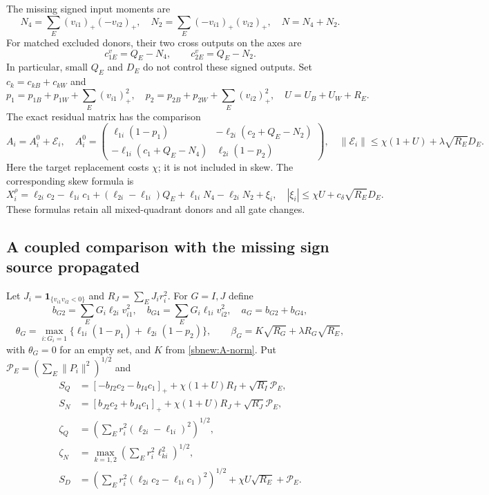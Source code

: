 \documentclass{article} %
\theoremstyle{plain}
\theoremstyle{definition}
\theoremstyle{remark}
\begin{document}
The missing signed input moments are
\begin{equation}\label{sbcouple:N}
 N_4=\sum_E(v_{i1})_+(-v_{i2})_+,\quad
 N_2=\sum_E(-v_{i1})_+(v_{i2})_+,\quad N=N_4+N_2.
\end{equation}
For matched excluded donors, their two cross outputs on the axes are
\[
 c_{1E}^v=Q_E-N_4,\qquad c_{2E}^v=Q_E-N_2.
\]
In particular, small $Q_E$ and $D_E$ do not control these signed outputs.
Set $c_k=c_{kB}+c_{kW}$ and
\[
 p_1=p_{1B}+p_{1W}+\sum_E(v_{i1})_+^2,\quad
 p_2=p_{2B}+p_{2W}+\sum_E(v_{i2})_+^2,\quad
 U=U_B+U_W+R_E.
\]
The exact residual matrix has the comparison
\begin{equation}\label{sbcouple:A0}
 A_i=A_i^0+\mathcal E_i,\quad
 A_i^0=\begin{pmatrix}
 \ell_{1i}(1-p_1)&-\ell_{2i}(c_2+Q_E-N_2)\\
 -\ell_{1i}(c_1+Q_E-N_4)&\ell_{2i}(1-p_2)
 \end{pmatrix},\quad
 \|\mathcal E_i\|\le\chi(1+U)+\lambda\sqrt{R_E}D_E.
\end{equation}
Here the target replacement costs $\chi$; it is not included in skew.
The corresponding skew formula is
\begin{equation}\label{sbcouple:X0}
 X_i^\rho=\ell_{2i}c_2-\ell_{1i}c_1
       +(\ell_{2i}-\ell_{1i})Q_E+\ell_{1i}N_4-\ell_{2i}N_2+\xi_i,
 \quad |\xi_i|\le\chi U+c_\delta\sqrt{R_E}D_E.
\end{equation}
These formulas retain all mixed-quadrant donors and all gate changes.

\subsection{A coupled comparison with the missing sign source propagated}

Let $J_i=\mathbf1_{\{v_{i1}v_{i2}<0\}}$ and $R_J=\sum_EJ_i r_i^2$.
For $G=I,J$ define
\[
 b_{G2}=\sum_EG_i\ell_{2i}v_{i1}^2,\quad
 b_{G4}=\sum_EG_i\ell_{1i}v_{i2}^2,\quad a_G=b_{G2}+b_{G4},
\]
\[
 \theta_G=\max_{i:G_i=1}
       \{\ell_{1i}(1-p_1)+\ell_{2i}(1-p_2)\},\qquad
 \beta_G=K\sqrt{R_G}+\lambda R_G\sqrt{R_E},
\]
with $\theta_G=0$ for an empty set, and $K$ from \eqref{sbnew:A-norm}.
Put $\mathcal P_E=(\sum_E\|P_i\|^2)^{1/2}$ and
\begin{align*}
 S_Q&=[-b_{I2}c_2-b_{I4}c_1]_+
             +\chi(1+U)R_I+\sqrt{R_I}\mathcal P_E,\\
 S_N&=[b_{J2}c_2+b_{J4}c_1]_+
             +\chi(1+U)R_J+\sqrt{R_J}\mathcal P_E,\\
 \zeta_Q&=\left(\sum_Er_i^2(\ell_{2i}-\ell_{1i})^2\right)^{1/2},\\
 \zeta_N&=\max_{k=1,2}\left(\sum_Er_i^2\ell_{ki}^2\right)^{1/2},\\
 S_D&=\left(\sum_Er_i^2(\ell_{2i}c_2-\ell_{1i}c_1)^2\right)^{1/2}
                    +\chi U\sqrt{R_E}+\mathcal P_E.
\end{align*}
\end{document}
